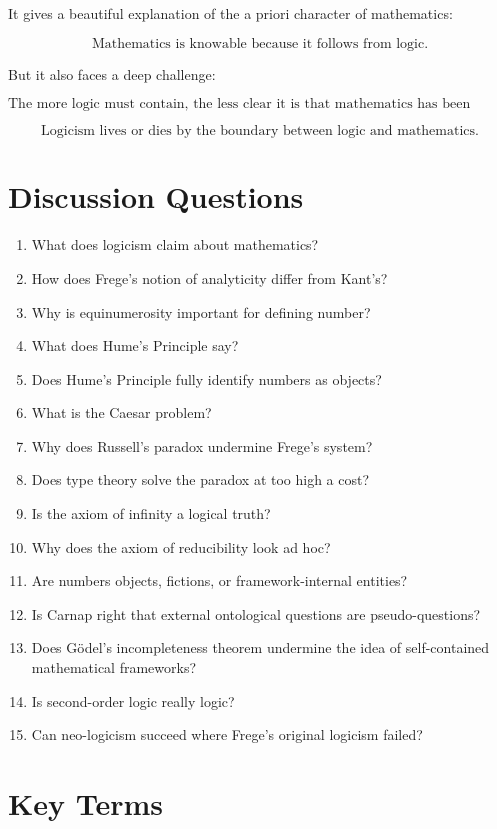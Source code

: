 \documentclass[11pt]{article}
\begin{document}
It gives a beautiful explanation of the a priori character of mathematics:

\[
\text{Mathematics is knowable because it follows from logic.}
\]

But it also faces a deep challenge:

\[
\text{The more logic must contain, the less clear it is that mathematics has been reduced.}
\]

\[
\boxed{
\text{Logicism lives or dies by the boundary between logic and mathematics.}
}
\]

\section*{Discussion Questions}

\begin{enumerate}[leftmargin=2em]
    \item What does logicism claim about mathematics?
    \item How does Frege's notion of analyticity differ from Kant's?
    \item Why is equinumerosity important for defining number?
    \item What does Hume's Principle say?
    \item Does Hume's Principle fully identify numbers as objects?
    \item What is the Caesar problem?
    \item Why does Russell's paradox undermine Frege's system?
    \item Does type theory solve the paradox at too high a cost?
    \item Is the axiom of infinity a logical truth?
    \item Why does the axiom of reducibility look ad hoc?
    \item Are numbers objects, fictions, or framework-internal entities?
    \item Is Carnap right that external ontological questions are pseudo-questions?
    \item Does G\"odel's incompleteness theorem undermine the idea of self-contained mathematical frameworks?
    \item Is second-order logic really logic?
    \item Can neo-logicism succeed where Frege's original logicism failed?
\end{enumerate}

\section*{Key Terms}
\end{document}
